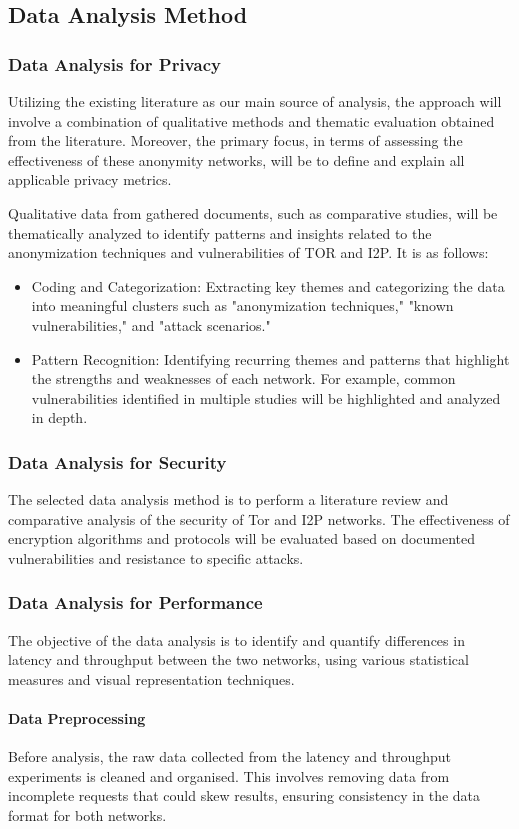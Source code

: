 \documentclass[12pt,conference]{IEEEtran}
\begin{document}
\subsection{Data Analysis Method}
\subsubsection{Data Analysis for Privacy}
Utilizing the existing literature as our main source of analysis, the approach will involve a combination of qualitative methods and thematic evaluation obtained from the literature. Moreover, the primary focus, in terms of assessing the effectiveness of these anonymity networks, will be to define and explain all applicable privacy metrics.

Qualitative data from gathered documents, such as comparative studies, will be thematically analyzed to identify patterns and insights related to the anonymization techniques and vulnerabilities of TOR and I2P. It is as follows:
\begin{itemize}
	\item Coding and Categorization: Extracting key themes and categorizing the data into meaningful clusters such as "anonymization techniques," "known vulnerabilities," and "attack scenarios."
	\item Pattern Recognition: Identifying recurring themes and patterns that highlight the strengths and weaknesses of each network. For example, common vulnerabilities identified in multiple studies will be highlighted and analyzed in depth.
\end{itemize}

\subsubsection{Data Analysis for Security}
The selected data analysis method is to perform a literature review and comparative analysis of the security of Tor and I2P networks. The effectiveness of encryption algorithms and protocols will be evaluated based on documented vulnerabilities and resistance to specific attacks.
\subsubsection{Data Analysis for Performance}
The objective of the data analysis is to identify and quantify differences in latency and throughput between the two networks, using various statistical measures and visual representation techniques.
\paragraph{Data Preprocessing} Before analysis, the raw data collected from the latency and throughput experiments is cleaned and organised. This involves removing data from incomplete requests that could skew results, ensuring consistency in the data format for both networks.
\end{document}
